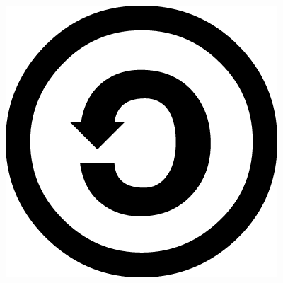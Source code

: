 \documentclass[twoside]{book}
\newcommand{\+}{\discretionary{\mbox{\scriptsize$\hookleftarrow$}}{}{}}
\newcommand{\clearemptydoublepage}{%
  \newpage{\pagestyle{empty}\cleardoublepage}%
}
\begin{document}
\begin{center}
\includegraphics[totalheight=5.mm]{../doc/figures/sa_large.png}%
\vspace*{0.25cm}

\end{center}

\clearemptydoublepage
\tableofcontents
\clearemptydoublepage
{}
\hypersetup{pageanchor=true}
\end{document}

